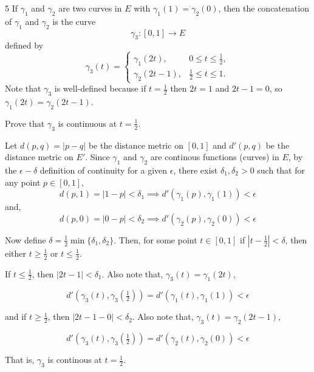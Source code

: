 \documentclass[12pt]{article}
\begin{document}
\newpage

\begin{problem}{5}
If $\gamma_1$ and $\gamma_2$ are two curves in $E$ with $\gamma_1(1)=\gamma_2(0)$, then the
concatenation of $\gamma_1$ and $\gamma_2$ is the curve
\[
\gamma_3 : [0,1] \to E
\]
defined by
\[
\gamma_3(t)=
\begin{cases}
\gamma_1(2t), & 0 \le t \le \tfrac{1}{2}, \\
\gamma_2(2t-1), & \tfrac{1}{2} \le t \le 1.
\end{cases}
\]
Note that $\gamma_3$ is well-defined because if $t=\tfrac{1}{2}$ then $2t=1$ and $2t-1=0$, so
$\gamma_1(2t)=\gamma_2(2t-1)$.

Prove that $\gamma_3$ is continuous at $t=\tfrac{1}{2}$.
\end{problem}

\begin{solution}
    \bbni

    Let $d(p,q) = |p-q|$ be the distance metric on $[0,1]$ and $d'(p,q)$ be the distance metric on $E'$. 
    Since $\gamma_1$ and $\gamma_2$ are continous functions (curves) in $E$, by the $\epsilon-\delta$ definition of continuity for a given $\epsilon$, there exist $\delta_1, \delta_2 > 0$ such that for any point $p \in [0,1]$,  
    \[d(p,1) = |1- p| < \delta_1 \implies d'(\gamma_1(p), \gamma_1(1)) < \epsilon\]
    and, 
    \[d(p,0) = |0- p| < \delta_2 \implies d'(\gamma_2(p), \gamma_2(0)) < \epsilon\]

    Now define $\delta = \frac{1}{2}\min\{\delta_1, \delta_2\}$. Then, for some point $t \in [0,1]$ if $|t - \frac{1}{2} | < \delta$, then either $ t \geq \frac{1}{2}$ or $t \leq \frac{1}{2}$. 
    
    If $t \leq \frac{1}{2}$, then $|2t - 1| < \delta_1$. Also note that, $\gamma_3(t) = \gamma_1(2t)$, 
    
    \[d' \left (\gamma_3(t), \gamma_3 \left (\tfrac{1}{2} \right ) \right ) = d'(\gamma_1(t), \gamma_1(1)) < \epsilon\]

    and if $t \geq \frac{1}{2}$, then $|2t - 1 - 0| < \delta_2$. Also note that, $\gamma_3(t) = \gamma_2(2t-1)$, 
    
    \[d' \left (\gamma_3(t), \gamma_3 \left (\tfrac{1}{2} \right ) \right ) = d'(\gamma_2(t), \gamma_2(0)) < \epsilon\]
    
    That is, $\gamma_3$ is continous at $t = \frac{1}{2}$. 

\end{solution}
\end{document}
